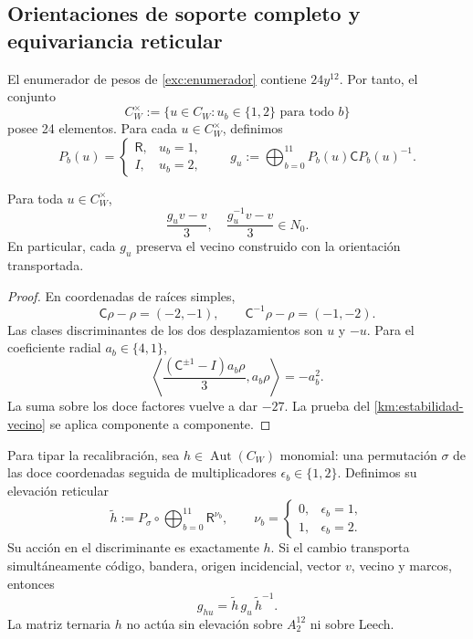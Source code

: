 \subsection{Orientaciones de soporte completo y equivariancia reticular}
\label{paper:24-orientaciones}

El enumerador de pesos de \eqref{exc:enumerador} contiene
\(24y^{12}\). Por tanto, el conjunto
\[
 C_W^\times:=
 \{u\in C_W:u_b\in\{1,2\}\text{ para todo }b\}
\]
posee 24 elementos. Para cada \(u\in C_W^\times\), definimos
\[
 P_b(u)=
 \begin{cases}
  \mathsf R,&u_b=1,\\
  I,&u_b=2,
 \end{cases}
 \qquad
 g_u:=\bigoplus_{b=0}^{11}P_b(u)\mathsf C P_b(u)^{-1}.
\]

\begin{proposition}
\label{paper:robustez-orientaciones}
Para toda \(u\in C_W^\times\),
\[
 \frac{g_uv-v}{3},
 \quad
 \frac{g_u^{-1}v-v}{3}
 \in N_0.
\]
En particular, cada \(g_u\) preserva el vecino construido con la
orientación transportada.
\end{proposition}

\begin{proof}
En coordenadas de raíces simples,
\[
 \mathsf C\rho-\rho=(-2,-1),
 \qquad
 \mathsf C^{-1}\rho-\rho=(-1,-2).
\]
Las clases discriminantes de los dos desplazamientos son \(u\) y \(-u\).
Para el coeficiente radial \(a_b\in\{4,1\}\),
\[
 \left\langle
 \frac{(\mathsf C^{\pm1}-I)a_b\rho}{3},a_b\rho
 \right\rangle=-a_b^2.
\]
La suma sobre los doce factores vuelve a dar \(-27\). La prueba del
\cref{km:estabilidad-vecino} se aplica componente a
componente.
\end{proof}

Para tipar la recalibración, sea
\(h\in\operatorname{Aut}(C_W)\) monomial: una permutación \(\sigma\) de
las doce coordenadas seguida de multiplicadores
\(\epsilon_b\in\{1,2\}\). Definimos su elevación reticular
\begin{equation}
 \widetilde h
 :=P_\sigma\circ
 \bigoplus_{b=0}^{11}\mathsf R^{\nu_b},
 \qquad
 \nu_b=
 \begin{cases}
 0,&\epsilon_b=1,\\
 1,&\epsilon_b=2.
 \end{cases}
 \label{paper:elevacion-monomial}
\end{equation}
Su acción en el discriminante es exactamente \(h\). Si el cambio transporta
simultáneamente código, bandera, origen incidencial, vector \(v\), vecino y
marcos, entonces
\begin{equation}
 g_{hu}=\widetilde h\,g_u\,\widetilde h^{-1}.
 \label{paper:naturalidad-isometrias}
\end{equation}
La matriz ternaria \(h\) no actúa sin elevación sobre \(A_2^{12}\) ni sobre
Leech.

